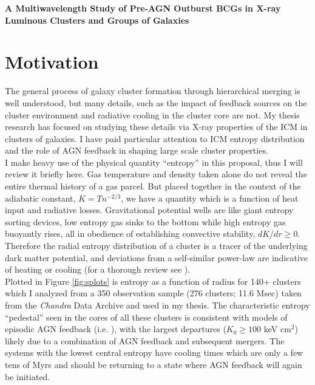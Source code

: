 \documentclass[11pt]{article}
\begin{document}
\begin{center}
\large
\textbf{A Multiwavelength Study of Pre-AGN Outburst BCGs in X-ray
Luminous Clusters and Groups of Galaxies}
\end{center}
\normalsize

\section{Motivation}

The general process of galaxy cluster formation through hierarchical
merging is well understood, but many details, such as the impact of
feedback sources on the cluster environment and radiative cooling in
the cluster core are not. My thesis research has focused on studying
these details via X-ray properties of the ICM in clusters of
galaxies. I have paid particular attention to ICM entropy
distribution and the role of AGN feedback in shaping large scale
cluster properties.\\

I make heavy use of the physical quantity ``entropy'' in this
proposal, thus I will review it briefly here. Gas temperature and
density taken alone do not reveal the entire thermal history of a gas
parcel. But placed together in the context of the adiabatic constant,
$K=Tn^{-2/3}$, we have a quantity which is a function of heat input
and radiative losses. Gravitational potential wells are like giant
entropy sorting devices, low entropy gas sinks to the bottom while
high entropy gas buoyantly rises, all in obedience of establishing
convective stability, $dK/dr \geq 0$. Therefore the radial entropy
distribution of a cluster is a tracer of the underlying dark matter
potential, and deviations from a self-similar power-law are indicative
of heating or cooling (for a thorough review see
\cite{2005RvMP...77..207V}).\\

Plotted in Figure \ref{fig:splots} is entropy as a function of radius
for 140+ clusters which I analyzed from a 350 observation sample (276
clusters; 11.6 Msec) taken from the {\it Chandra} Data Archive and
used in my thesis. The characteristic entropy ``pedestal'' seen in the
cores of all these clusters is consistent with models of episodic AGN
feedback (i.e. \cite{2005ApJ...634..955V}), with the largest departures
($K_0 \geq 100$ keV cm$^2$) likely due to a combination of AGN
feedback and subsequent mergers. The systems with the lowest central
entropy have cooling times which are only a few tens of Myrs and
should be returning to a state where AGN feedback will again be initiated.\\
\end{document}

